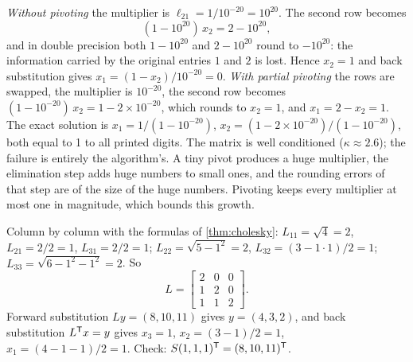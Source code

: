 \begin{solutions}
  \item \emph{Without pivoting} the multiplier is $\ell_{21} = 1/10^{-20} = 10^{20}$. The second row becomes
        \[
          (1 - 10^{20})\,x_2 = 2 - 10^{20},
        \]
        and in double precision both $1 - 10^{20}$ and $2 - 10^{20}$ round to $-10^{20}$: the information carried by the original entries
        $1$ and $2$ is lost. Hence $x_2 = 1$ and back substitution gives $x_1 = (1 - x_2)/10^{-20} = 0$. \emph{With partial pivoting} the rows
        are swapped, the multiplier is $10^{-20}$, the second row becomes $(1 - 10^{-20})\,x_2 = 1 - 2\times10^{-20}$, which rounds to
        $x_2 = 1$, and $x_1 = 2 - x_2 = 1$. The exact solution is $x_1 = 1/(1 - 10^{-20})$, $x_2 = (1 - 2\times10^{-20})/(1 - 10^{-20})$, both equal to 1
        to all printed digits. The matrix is well conditioned ($\kappa \approx 2.6$); the failure is entirely the algorithm's. A tiny pivot
        produces a huge multiplier, the elimination step adds huge numbers to small ones, and the rounding errors of that step are
        of the size of the huge numbers. Pivoting keeps every multiplier at most one in magnitude, which bounds this growth.

  \item Column by column with the formulas of \cref{thm:cholesky}: $L_{11} = \sqrt4 = 2$, $L_{21} = 2/2 = 1$, $L_{31} = 2/2 = 1$;
        $L_{22} = \sqrt{5 - 1^2} = 2$, $L_{32} = (3 - 1\cdot1)/2 = 1$; $L_{33} = \sqrt{6 - 1^2 - 1^2} = 2$. So
        \[
          L = \begin{bmatrix}2 & 0 & 0\\ 1 & 2 & 0\\ 1 & 1 & 2\end{bmatrix}.
        \]
        Forward substitution $Ly = (8, 10, 11)$ gives $y = (4, 3, 2)$, and back substitution $L^{\mathsf{T}} x = y$ gives $x_3 = 1$, $x_2 = (3 - 1)/2 = 1$,
        $x_1 = (4 - 1 - 1)/2 = 1$. Check: $S(1, 1, 1)^{\mathsf{T}} = (8, 10, 11)^{\mathsf{T}}$.


\end{solutions}
